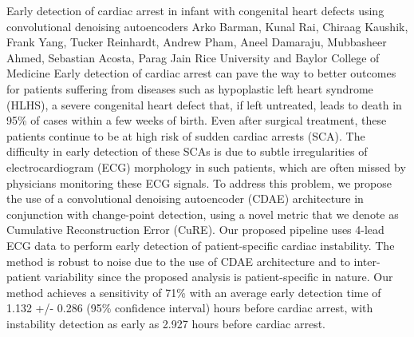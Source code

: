 \begin{addmargin}[2em]{0em}
\vspace{1.5ex}
\abs
{Early detection of cardiac arrest in infant with congenital heart defects using convolutional denoising autoencoders}
{Arko Barman, Kunal Rai, Chiraag Kaushik, Frank Yang, Tucker Reinhardt, Andrew Pham, Aneel Damaraju, Mubbasheer Ahmed, Sebastian Acosta, Parag Jain}
{Rice University and Baylor College of Medicine}
{Early detection of cardiac arrest can pave the way to better outcomes for patients suffering from diseases such as hypoplastic left heart syndrome (HLHS), a severe congenital heart defect that, if left untreated, leads to death in 95\% of cases within a few weeks of birth. Even after surgical treatment, these patients continue to be at high risk of sudden cardiac arrests (SCA). The difficulty in early detection of these SCAs is due to subtle irregularities of electrocardiogram (ECG) morphology in such patients, which are often missed by physicians monitoring these ECG signals. To address this problem, we propose the use of a convolutional denoising autoencoder (CDAE) architecture in conjunction with change-point detection, using a novel metric that we denote as Cumulative Reconstruction Error (CuRE). Our proposed pipeline uses 4-lead ECG data to perform early detection of patient-specific cardiac instability. The method is robust to noise due to the use of CDAE architecture and to inter-patient variability since the proposed analysis is patient-specific in nature. Our method achieves a sensitivity of 71\% with an average early detection time of 1.132 +/- 0.286 (95\% confidence interval) hours before cardiac arrest, with instability detection as early as 2.927 hours before cardiac arrest.}



\end{addmargin}
